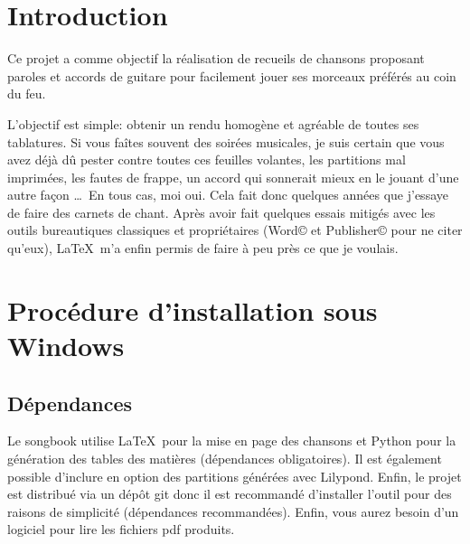 \documentclass[versionenligne]{patacrep}
\begin{document}

\thispagestyle{empty}
\tableofcontents \newpage

\section*{Introduction}

Ce projet a comme objectif la réalisation de recueils de chansons
proposant paroles et accords de guitare pour facilement jouer ses
morceaux préférés au coin du feu.

L'objectif est simple: obtenir un rendu homogène et agréable de toutes
ses tablatures. Si vous faîtes souvent des soirées musicales, je suis
certain que vous avez déjà dû pester contre toutes ces feuilles
volantes, les partitions mal imprimées, les fautes de frappe, un
accord qui sonnerait mieux en le jouant d'une autre façon \dots\,
En tous cas, moi oui. Cela fait donc quelques années que j'essaye de
faire des carnets de chant. Après avoir fait quelques essais mitigés
avec les outils bureautiques classiques et propriétaires (Word© et
Publisher© pour ne citer qu'eux), \LaTeX\, m'a enfin permis de faire à
peu près ce que je voulais.

\section{Procédure d'installation sous Windows}

\subsection{Dépendances}\label{sec:songbook-dep-win}

Le songbook utilise \LaTeX\, pour la mise en page des chansons et Python
pour la génération des tables des matières (dépendances obligatoires).
Il est également possible d'inclure en option des partitions générées
avec Lilypond. Enfin, le projet est distribué via un dépôt git donc il
est recommandé d'installer l'outil pour des raisons de simplicité
(dépendances recommandées). Enfin, vous aurez besoin d'un logiciel
pour lire les fichiers pdf produits.
\end{document}
